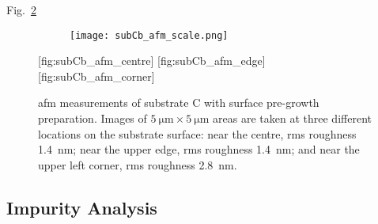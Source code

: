 Fig.~\ref{fig:subCb_afm}
\begin{figure}[htbp]
    \centering
    \begin{subfigure}[c]{0.032\linewidth}
        \label{fig:subCb_afm_scale}\captionsetup{list=no}
        \texttt{[image: subCb\_afm\_scale.png]}
    \end{subfigure}
    \hfill
    [fig:subCb_afm_centre]  %
    \hfill
    [fig:subCb_afm_edge]  %
    \hfill
    [fig:subCb_afm_corner]  %
    \caption[\Ac{afm} of substrate C with surface pre-growth preparation.]{\Ac{afm} measurements of substrate C with surface pre-growth preparation. Images of $\SI{5}{\micro\metre}\times\SI{5}{\micro\metre}$ areas are taken at three different locations on the substrate surface:  near the centre, \ac{rms} roughness \SI{1.4}{\nano\metre};  near the upper edge, \ac{rms} roughness \SI{1.4}{\nano\metre}; and  near the upper left corner, \ac{rms} roughness \SI{2.8}{\nano\metre}.}
    \label{fig:subCb_afm}
\end{figure} %

\subsection{Impurity Analysis}


